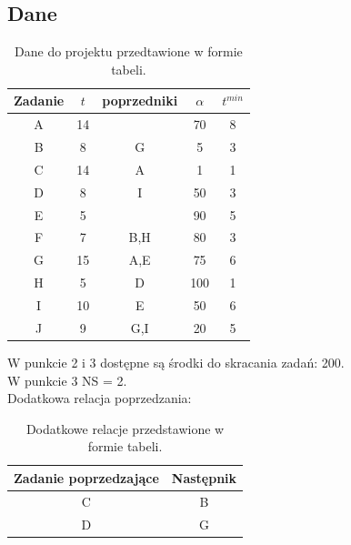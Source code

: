 \documentclass[
    12pt, %
]{../fphw}
\begin{document}
\subsection{Dane}
\begin{table}[H]
    \centering
    \begin{tabular} {| c | c | c | c | c |}
        \hline
        Zadanie & \(t\) & poprzedniki & \(\alpha\) & \(t^{min}\) \\
        \hline
        A       & 14    &             & 70         & 8           \\
        \hline
        B       & 8     & G           & 5          & 3           \\
        \hline
        C       & 14    & A           & 1          & 1           \\
        \hline
        D       & 8     & I           & 50         & 3           \\
        \hline
        E       & 5     &             & 90         & 5           \\
        \hline
        F       & 7     & B,H         & 80         & 3           \\
        \hline
        G       & 15    & A,E         & 75         & 6           \\
        \hline
        H       & 5     & D           & 100        & 1           \\
        \hline
        I       & 10    & E           & 50         & 6           \\
        \hline
        J       & 9     & G,I         & 20         & 5           \\
        \hline
    \end{tabular}
    \caption{Dane do projektu przedtawione w formie tabeli.}
    \label{tab:dane}
\end{table}
W punkcie 2 i 3 dostępne są środki do skracania zadań: 200. \\
W punkcie 3 NS = 2. \\
Dodatkowa relacja poprzedzania: \\
\begin{table}[H]
    \centering
    \begin{tabular}{| c | c |}
        \hline
        Zadanie poprzedzające & Następnik \\
        \hline
        C & B \\
        \hline
        D & G \\
        \hline
    \end{tabular}
    \caption{Dodatkowe relacje przedstawione w formie tabeli.}
    \label{tab:dod_rel}  
\end{table}
\newpage
\end{document}

